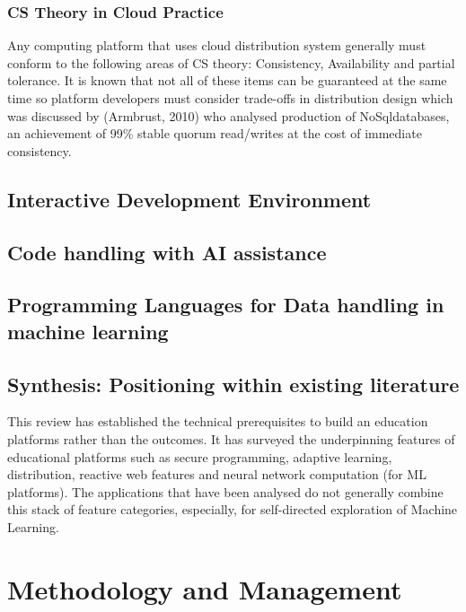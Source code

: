 \documentclass{article}
\begin{document}
\subsubsection{CS Theory in Cloud Practice}
Any computing platform that uses cloud distribution system generally must conform to the following areas of CS theory: Consistency, Availability and partial tolerance. It is known that not all of these items can be guaranteed at the same time so platform developers must consider trade-offs in distribution design which was discussed by (Armbrust, 2010) who analysed production of NoSqldatabases, an achievement of 99\% stable quorum read/writes at the cost of immediate consistency.

\subsection{Interactive Development Environment}

\subsection{Code handling with AI assistance}

\subsection{Programming Languages for Data handling in machine learning}

\subsection{Synthesis: Positioning within existing literature} 
This review has established the technical prerequisites to build an education platforms rather than the outcomes. It has surveyed the underpinning features of educational platforms such as secure programming, adaptive learning, distribution, reactive web features and neural network computation (for ML platforms). The applications that have been analysed do not generally combine this stack of feature categories, especially, for self-directed exploration of Machine Learning.


\section{Methodology and Management} %
\end{document}
